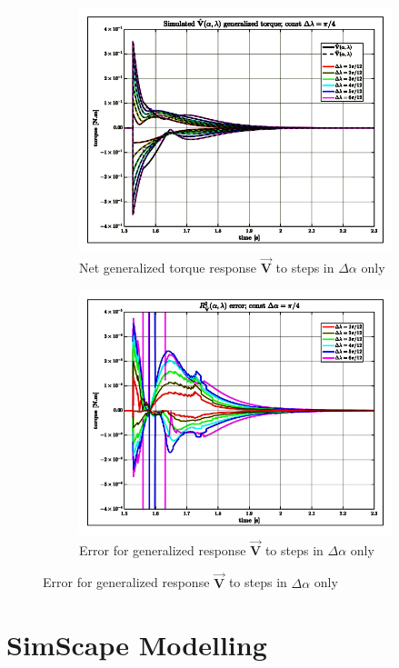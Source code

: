 \par
\begin{figure}[htbp]
\centering
\begin{subfigure}{0.49\textwidth}
\centering
\includegraphics[width=\textwidth]{graphs/tau-comb-alph}
\caption{Net generalized torque response $\vec{\mathbf{V}}$ to steps in $\Delta\alpha$ only}
\end{subfigure}
\begin{subfigure}{0.49\textwidth}
\centering
\includegraphics[width=\textwidth]{graphs/tau-comb-alph-r}
\caption{Error for generalized response $\vec{\mathbf{V}}$ to steps in $\Delta\alpha$ only}
\end{subfigure}
\end{figure}

\newpage
\section{SimScape Modelling}
\label{app:simscape}
